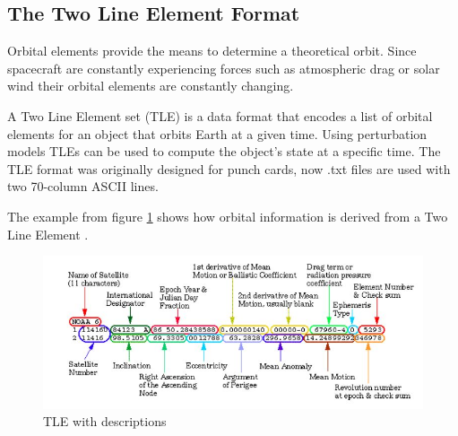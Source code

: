 \documentclass[12pt]{article}
\begin{document}
	
	
	
	\subsection{The Two Line Element Format}
	
	Orbital elements provide the means to determine a theoretical orbit. Since spacecraft are constantly experiencing forces such as atmospheric drag or solar wind their orbital elements are constantly changing. \par 
	A Two Line Element set (TLE) is a data format that encodes a list of orbital elements for an object that orbits Earth at a given time. Using perturbation models TLEs can be used to compute the object's state at a specific time. The TLE format was originally designed for punch cards, now .txt files are used with two 70-column ASCII lines.  \par 
	
	The example from figure \ref{fig:tlenasa} shows how orbital information is derived from a Two Line Element \cite{NASATLE}.
	\begin{figure}[H]
		\centering
		\includegraphics[width=0.7\linewidth]{tle_nasa}
		\caption{TLE with descriptions}
		\label{fig:tlenasa}
	\end{figure}
	
\end{document}
